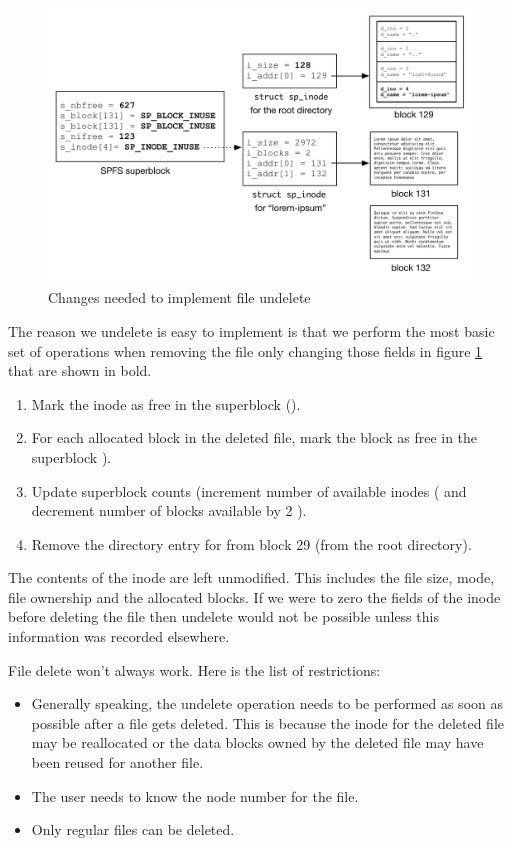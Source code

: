 \begin{figure}
	\includegraphics[scale=0.6]{figures/undelete.pdf}
	\centering
	\caption{Changes needed to implement file undelete}
	\label{fig:undelete}
\end{figure}

The reason we undelete is easy to implement is that we perform the most basic set of operations when removing the file only changing those fields in figure \ref{fig:undelete} that are shown in bold.

\begin{enumerate}
	\item Mark the inode as free in the superblock ().
	\item For each allocated block in the deleted file, mark the block as free in the superblock ).
	\item Update superblock counts (increment number of available inodes ( and decrement number 
		of blocks available by 2 ).
	\item Remove the directory entry for  from block 29 (from the root directory).
\end{enumerate}

\noindent
The contents of the inode are left unmodified. This includes the file size, mode, file ownership and the allocated blocks. If we were to zero the fields of the inode before deleting the file then undelete would not be possible unless this information was recorded elsewhere.

File delete won't always work. Here is the list of restrictions:

\begin{itemize}
	\item Generally speaking, the undelete operation needs to be performed as soon as possible after
		a file gets deleted. This is because the inode for the deleted file may be reallocated or the data 
		blocks owned by the deleted file may have been reused for another file.
	\item The user needs to know the node number for the file.
	\item Only regular files can be deleted.
\end{itemize}

